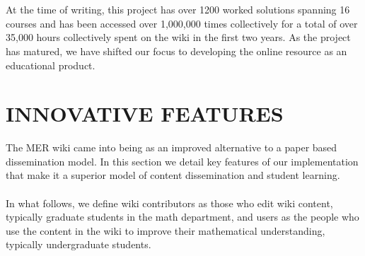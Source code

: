 \documentclass{primus}
\begin{document}
\\\\
\noindent{}At the time of writing, this project has over 1200 worked solutions spanning 16 courses and has been accessed over 1,000,000 times collectively for a total of over 35,000 hours collectively spent on the wiki in the first two years.  As the project has matured, we have shifted our focus to developing the online resource as an educational product.

\section{INNOVATIVE FEATURES}\label{sec:Innovative_Features}
The MER wiki came into being as an improved alternative to a paper based dissemination model.  In this section we detail key features of our implementation that make it a superior model of content dissemination and student learning.  
\\\\
\noindent{}In what follows, we define wiki contributors as those who edit wiki content, typically graduate students in the math department, and users as the people who use the content in the wiki to improve their mathematical understanding, typically undergraduate students.  
\end{document}
